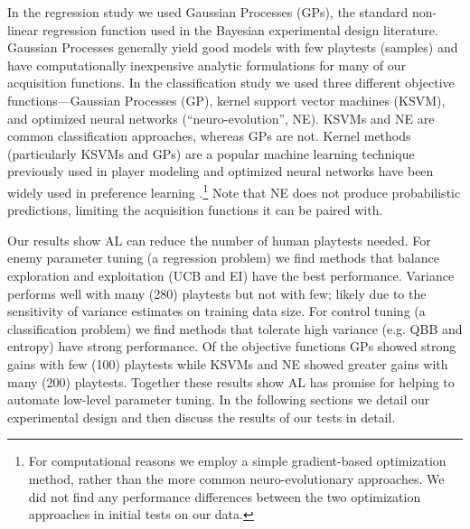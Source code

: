 \documentclass{sig-alternate}
\begin{document}
In the regression study we used Gaussian Processes (GPs), the standard non-linear regression function used in the Bayesian experimental design literature.
Gaussian Processes generally yield good models with few playtests (samples) and have computationally inexpensive analytic formulations for many of our acquisition functions.
In the classification study we used three different objective functions---Gaussian Processes (GP), kernel support vector machines (KSVM), and optimized neural networks (``neuro-evolution'', NE).
KSVMs and NE are common classification approaches, whereas GPs are not.
Kernel methods (particularly KSVMs and GPs) are a popular machine learning technique previously used in player modeling \cite{yu2011:minboredom} and optimized neural networks have been widely used in preference learning \cite{yannakakis2011:edpcg}.\footnote{For computational reasons we employ a simple gradient-based optimization method, rather than the more common neuro-evolutionary approaches. 
We did not find any performance differences between the two optimization approaches in initial tests on our data.}
Note that NE does not produce probabilistic predictions, limiting the acquisition functions it can be paired with.


Our results show AL can reduce the number of human playtests needed.
For enemy parameter tuning (a regression problem) we find methods that balance exploration and exploitation (UCB and EI) have the best performance.
Variance performs well with many (280) playtests but not with few; likely due to the sensitivity of variance estimates on training data size.
%
For control tuning (a classification problem) we find methods that tolerate high variance (e.g. QBB and entropy) have strong performance.
Of the objective functions GPs showed strong gains with few (100) playtests while KSVMs and NE showed greater gains with many (200) playtests.
Together these results show AL has promise for helping to automate low-level parameter tuning.
In the following sections we detail our experimental design and then discuss the results of our tests in detail.
\end{document}
